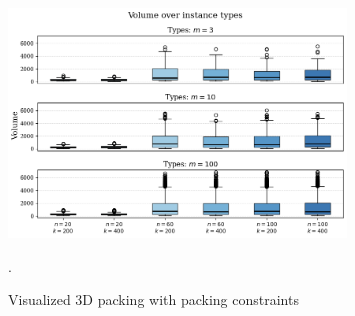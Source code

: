 \begin{figure}[ht]
    \centering
    \includegraphics[width=0.8\textwidth]{pictures/volume_over_instances_krebs.png}
    \caption{Visualized 3D packing with packing constraints}.
    \label{fig:krebs_dataset_analysis}
\end{figure}


